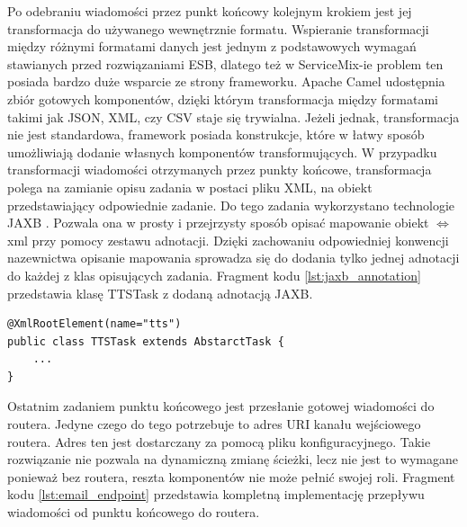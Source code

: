 Po odebraniu wiadomości przez punkt końcowy kolejnym krokiem jest jej transformacja do używanego wewnętrznie formatu. Wspieranie transformacji między różnymi formatami danych jest jednym z podstawowych wymagań stawianych przed rozwiązaniami ESB, dlatego też w ServiceMix-ie problem ten posiada bardzo duże wsparcie ze strony frameworku. Apache Camel udostępnia zbiór gotowych komponentów, dzięki którym transformacja między formatami takimi jak JSON, XML, czy CSV staje się trywialna. Jeżeli jednak, transformacja nie jest standardowa, framework posiada konstrukcje, które w łatwy sposób umożliwiają dodanie własnych komponentów transformujących. W przypadku transformacji wiadomości otrzymanych przez punkty końcowe, transformacja polega na zamianie opisu zadania w postaci pliku XML, na obiekt przedstawiający odpowiednie zadanie. Do tego zadania wykorzystano technologie JAXB \cite{jaxb2008}. Pozwala ona w prosty i przejrzysty sposób opisać mapowanie obiekt \begin{math}\Leftrightarrow\end{math} xml przy pomocy zestawu adnotacji. Dzięki zachowaniu odpowiedniej konwencji nazewnictwa opisanie mapowania sprowadza się do dodania tylko jednej adnotacji do każdej z klas opisujących zadania. Fragment kodu \ref{lst:jaxb_annotation} przedstawia klasę TTSTask z dodaną adnotacją JAXB.


\lstset{language=Java, tabsize=4, caption=Definicja klasy TTSTask wraz z adnotacjami JAXB .,label=lst:jaxb_annotation}

\begin{center}
\begin{lstlisting}
@XmlRootElement(name="tts")
public class TTSTask extends AbstarctTask {
	...
}
\end{lstlisting}
\end{center}

Ostatnim zadaniem punktu końcowego jest przesłanie gotowej wiadomości do routera. Jedyne czego do tego potrzebuje to adres URI kanału wejściowego routera. Adres ten jest dostarczany za pomocą pliku konfiguracyjnego. Takie rozwiązanie nie pozwala na dynamiczną zmianę ścieżki, lecz nie jest to wymagane ponieważ bez routera, reszta komponentów nie może pełnić swojej roli.
Fragment kodu \ref{lst:email_endpoint} przedstawia kompletną implementację przepływu wiadomości od punktu końcowego do routera.

\lstset{language=XML, tabsize=4, caption=Przykładowa\, kompletna implementacja przypływu wiadomości od punktu końcowego do routera przy pomocy XML DSL.,label=lst:email_endpoint}


